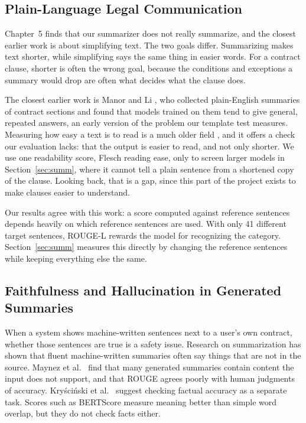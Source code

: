 \subsection{Plain-Language Legal Communication}
\label{sec:lit_plain}
Chapter~5 finds that our summarizer does not really summarize, and the closest earlier work is about simplifying text. The two goals differ. Summarizing makes text shorter, while simplifying says the same thing in easier words. For a contract clause, shorter is often the wrong goal, because the conditions and exceptions a summary would drop are often what decides what the clause does.

The closest earlier work is Manor and Li \cite{manor2019plain}, who collected plain-English summaries of contract sections and found that models trained on them tend to give general, repeated answers, an early version of the problem our template test measures. Measuring how easy a text is to read is a much older field \cite{flesch1948}, and it offers a check our evaluation lacks: that the output is easier to read, and not only shorter. We use one readability score, Flesch reading ease, only to screen larger models in Section~\ref{sec:summ}, where it cannot tell a plain sentence from a shortened copy of the clause. Looking back, that is a gap, since this part of the project exists to make clauses easier to understand.

Our results agree with this work: a score computed against reference sentences depends heavily on which reference sentences are used. With only 41 different target sentences, ROUGE-L rewards the model for recognizing the category. Section~\ref{sec:summ} measures this directly by changing the reference sentences while keeping everything else the same.
\subsection{Faithfulness and Hallucination in Generated Summaries}
\label{sec:lit_faith}
When a system shows machine-written sentences next to a user's own contract, whether those sentences are true is a safety issue. Research on summarization has shown that fluent machine-written summaries often say things that are not in the source. Maynez et al.\ \cite{maynez2020faithfulness} find that many generated summaries contain content the input does not support, and that ROUGE agrees poorly with human judgments of accuracy. Kry\'{s}ci\'{n}ski et al.\ \cite{kryscinski2020factcc} suggest checking factual accuracy as a separate task. Scores such as BERTScore \cite{zhang2020bertscore} measure meaning better than simple word overlap, but they do not check facts either.

